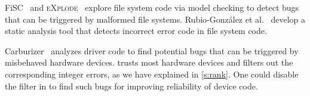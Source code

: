 FiSC~\cite{fisc:yang} and \textsc{eXplode}~\cite{explode:yang}
explore file system code via model checking to detect bugs that can
be triggered by malformed file systems.
%
Rubio-González et al.~\cite{eio} develop a static analysis tool
that detects incorrect error code in file system code.

Carburizer~\cite{kadav:tolerating} analyzes driver code to find
potential bugs that can be triggered by misbehaved hardware devices.
\sys trusts most hardware devices and filters out the corresponding
integer errors, as we have explained in \autoref{s:rank}.  One could
disable the filter in \sys to find such bugs for improving reliability
of device code.
